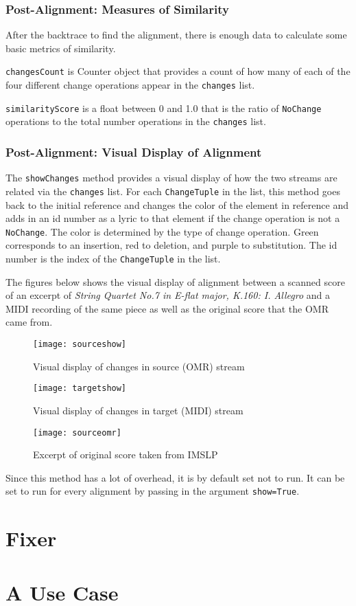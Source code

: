 \subsubsection{Post-Alignment: Measures of Similarity}
After the backtrace to find the alignment, there is enough data to calculate some basic metrics of similarity. 

\texttt{changesCount} is Counter object that provides a count of how many of each of the four different change operations appear in the \texttt{changes} list. 

\texttt{similarityScore} is a float between 0 and 1.0 that is the ratio of \texttt{NoChange} operations to the total number operations in the \texttt{changes} list.
\subsubsection{Post-Alignment: Visual Display of Alignment}
The \texttt{showChanges} method provides a visual display of how the two streams are related via the \texttt{changes} list. For each \texttt{ChangeTuple} in the list, this method goes back to the initial reference and changes the color of the element in reference and adds in an id number as a lyric to that element if the change operation is not a \texttt{NoChange}. The color is determined by the type of change operation. Green corresponds to an insertion, red to deletion, and purple to substitution. The id number is the index of the \texttt{ChangeTuple} in the list. 

The figures below shows the visual display of alignment between a scanned score of an excerpt of \textit{String Quartet No.7 in E-flat major, K.160: I. Allegro} and a MIDI recording of the same piece as well as the original score that the OMR came from. 

\begin{figure}[H]
\centering
\texttt{[image: sourceshow]}
\caption{Visual display of changes in source (OMR) stream}
\end{figure}

\begin{figure}[H]
\centering
\texttt{[image: targetshow]}
\caption{Visual display of changes in target (MIDI) stream}
\end{figure}

\begin{figure}[H]
\centering
\texttt{[image: sourceomr]}
\caption{Excerpt of original score taken from IMSLP}
\end{figure}

Since this method has a lot of overhead, it is by default set not to run. It can be set to run for every alignment by passing in the argument \texttt{show=True}. 

\section{Fixer}
\section{A Use Case}